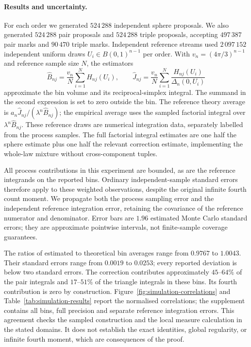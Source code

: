 \documentclass[11pt,a4paper]{article}
\numberwithin{equation}{section}
\theoremstyle{definition}
\theoremstyle{remark}
\begin{document}
\paragraph{Results and uncertainty.}
For each order we generated $524\,288$ independent sphere proposals. We also
generated $524\,288$ pair proposals and $524\,288$ triple proposals,
accepting $497\,387$ pair marks and $90\,470$ triple marks. Independent
reference streams used $2\,097\,152$ independent uniform draws
$U_i\in B(0,1)^{n-1}$ per order. With $v_n=(4\pi/3)^{n-1}$ and reference
sample size $N$, the estimators
\[
 \widehat B_{nj}=\frac{v_n}{N}\sum_{i=1}^N H_{nj}(U_i),\qquad
 \widehat J_{nj}=\frac{v_n}{N}\sum_{i=1}^N
       \frac{H_{nj}(U_i)}{\Delta_n(0,U_i)}
\]
approximate the bin volume and its reciprocal-simplex integral. The summand
in the second expression is set to zero outside the bin. The reference
theory average is $a_n\widehat J_{nj}/(\lambda^n\widehat B_{nj})$;
the empirical average uses the sampled factorial integral over
$\lambda^n\widehat B_{nj}$. These reference draws are numerical integration
data, separately labelled from the process samples.
The full factorial integral estimates are
one half the sphere estimate plus one half the relevant correction estimate,
implementing the whole-law mixture without cross-component tuples.

All process contributions in this experiment are bounded, as are the
reference integrands on the reported bins. Ordinary independent-sample
standard errors therefore apply to these weighted observations, despite
the original infinite fourth count moment. We propagate both the process
sampling error and the independent reference integration error, retaining
the covariance of the reference numerator and denominator. Error bars are
$1.96$ estimated Monte Carlo standard errors; they are approximate
pointwise intervals, not finite-sample coverage guarantees.

The ratios of estimated to theoretical bin averages range from $0.9767$
to $1.0043$. Their standard errors range from $0.0019$ to $0.0253$;
every reported deviation is below two standard errors. The correction
contributes approximately $45$--$64\%$ of the pair integrals and
$17$--$51\%$ of the triangle integrals in these bins. Its fourth contribution
is zero by construction. Figure~\ref{fig:simulation-correlations} and
Table~\ref{tab:simulation-results} report the normalised correlations;
the supplement contains all bins, full precision and separate reference
integration errors. This agreement checks the sampled construction and
the local measure calculation in the stated domains. It does not establish
the exact identities, global regularity, or infinite fourth moment, which
are consequences of the proof.
\end{document}
